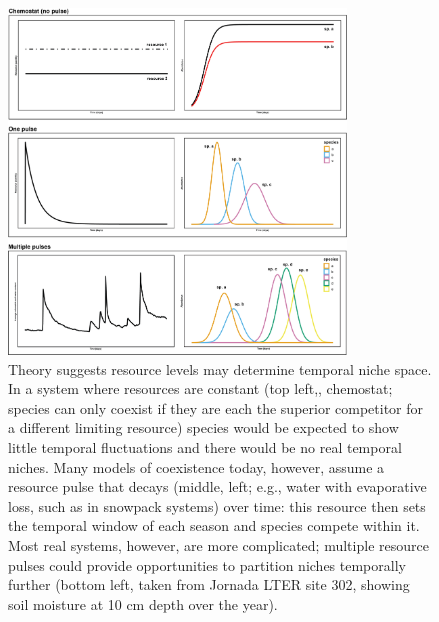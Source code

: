 \documentclass[11pt]{article}
\begin{document}
\begin{figure}[h!]
\centering
\includegraphics[width=0.8\textwidth]{..//figures/JN_conceptfigs/sixpanel_concept_increasespp.png}
\caption{Theory suggests resource levels may determine temporal niche space. In a system where resources are constant (top left,, chemostat; species can only coexist if they are each the superior competitor for a different limiting resource) species would be expected to show little temporal fluctuations and there would be no real temporal niches. Many models of coexistence today, however, assume a resource pulse that decays (middle, left; e.g., water with evaporative loss, such as in snowpack systems) over time: this resource then sets the temporal window of each season and species compete within it. Most real systems, however, are more complicated; multiple resource pulses could provide opportunities to partition niches temporally further (bottom left, taken from Jornada LTER site 302, showing soil moisture at 10 cm depth over the year).} 
 \label{fig:resource}
\end{figure}
\end{document}
